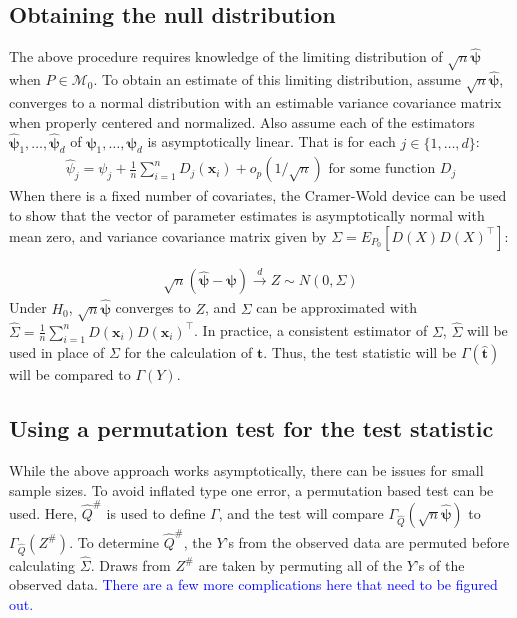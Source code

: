 \documentclass{article}
\newcommand{\vmat}{\Sigma}
\newcommand{\rvo}{X}
\newcommand{\disto}{P}
\newcommand{\tst}{\hat{\boldsymbol{t}}}
\newcommand{\rvt}{Y}
\newcommand{\rvv}{Z}
\newcommand{\distv}{Q}
\begin{document}
\subsection{Obtaining the null distribution}
\label{ssec:obtaining_null}
The above procedure requires knowledge of the limiting distribution of $\sqrt{n}\hat{\boldsymbol{\psi}}$ when $P \in \mathscr{M}_0$.  To obtain an estimate of this limiting distribution, assume $\sqrt{n}\hat{\boldsymbol{\psi}}$, converges to a normal distribution with an estimable variance covariance matrix when properly centered and normalized. Also assume each of the estimators $\hat{\boldsymbol{\psi}}_1, \dots, \hat{\boldsymbol{\psi}}_d$ of $\boldsymbol{\psi}_1, \dots, \boldsymbol{\psi}_d$ is asymptotically linear.  That is for each $j \in \{1, \dots, d\}$:
\begin{align*}
\hat{\psi}_j = \psi_j + \frac{1}{n}\sum_{i=1}^n D_j(\boldsymbol{x}_i) + o_p(1/\sqrt{n}) \text{ for some function } D_j
\end{align*}
When there is a fixed number of covariates, the Cramer-Wold device can be used to show that the vector of parameter estimates is asymptotically normal with mean zero, and variance covariance matrix given by $\Sigma = E_{\disto_0}\left[D(\rvo) D(\rvo)^\top \right]$:

\begin{align*}
    \sqrt{n}\left(\hat{\boldsymbol{\psi}} - \boldsymbol{\psi}\right) \xrightarrow{d} \rvv \sim N\left(0, \Sigma\right)
\end{align*}
Under $H_0$, $\sqrt{n}\hat{\boldsymbol{\psi}}$ converges to $Z$, and $\Sigma$ can be approximated with $\widehat{\Sigma} = \frac{1}{n}\sum_{i = 1}^n D(\boldsymbol{x}_i) D(\boldsymbol{x}_i)^\top$.  In practice, a consistent estimator of $\vmat$, $\hat{\vmat}$ will be used in place of $\vmat$ for the calculation of $\tst$. Thus, the test statistic will be $\Gamma(\tst)$ will be compared to $\Gamma(\rvt)$.

\subsection{Using a permutation test for the test statistic}
While the above approach works asymptotically, there can be issues for small sample sizes.  To avoid inflated type one error, a permutation based test can be used.  Here, $\hat{\distv}^\#$ is used to define $\Gamma$, and the test will compare $\Gamma_{\hat{\distv}}(\sqrt{n} \hat{\boldsymbol{\psi}})$ to $\Gamma_{\hat{\distv}}(\rvv^\#)$. To determine $\hat{\distv}^\#$, the $Y$'s from the observed data are permuted before calculating $\widehat \Sigma$.  Draws from $\rvv^\#$ are taken by permuting all of the $Y$'s of the observed data.  \textcolor{blue}{There are a few more complications here that need to be figured out.}
\end{document}
